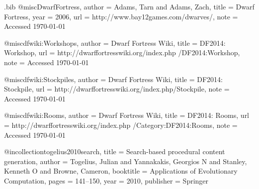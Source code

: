 \begin{filecontents*}{\jobname.bib}
@misc{DwarfFortress,
	author 	= {Adams, Tarn and Adams, Zach},
	title 		= {{D}warf {F}ortress},
	year 		= {2006}, 
	url 		= {http://www.bay12games.com/dwarves/},
	note		= {Accessed \today}
}

@misc{dfwiki:Workshops,
	author 	= {Dwarf Fortress Wiki},
	title 		= {{D}{F}2014: {W}orkshop},
	url 		= {http://dwarffortresswiki.org/index.php /DF2014:Workshop},
	note		= {Accessed \today}
}

@misc{dfwiki:Stockpiles,
	author 	= {Dwarf Fortress Wiki},
	title 		= {{D}{F}2014: {S}tockpile},
	url 		= {http://dwarffortresswiki.org/index.php/Stockpile},
	note		= {Accessed \today}
}

@misc{dfwiki:Rooms,
	author 	= {Dwarf Fortress Wiki},
	title 		= {{D}{F}2014: {R}ooms},
	url 		= {http://dwarffortresswiki.org/index.php /Category:DF2014:Rooms},
	note		= {Accessed \today}
}

@incollection{togelius2010search,
	title		= {{S}earch-based procedural content generation},
	author	= {Togelius, Julian and Yannakakis, Georgios N and Stanley, Kenneth O and Browne, Cameron},
	booktitle	= {Applications of Evolutionary Computation},
	pages		= {141--150},
	year		= {2010},
	publisher	= {Springer}
}

\end{filecontents*}

\nocite{*}
